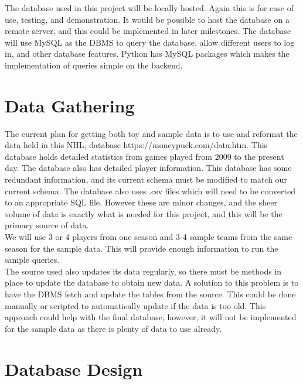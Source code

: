 \documentclass[11pt]{article}
\begin{document}
The database used in this project will be locally hosted. Again this is for ease of use, testing, and demonstration. It would be possible to host the database on a remote server, and this could be implemented in later milestones. The database will use MySQL as the DBMS to query the database, allow different users to log in, and other database features. Python has MySQL packages which makes the implementation of queries simple on the backend. \\ 

\section{Data Gathering}
The current plan for getting both toy and sample data is to use and reformat the data held in this NHL, database https://moneypuck.com/data.htm. This database holds detailed statistics from games played from 2009 to the present day. The database also has detailed player information. This database has some redundant information, and its current schema must be modified to match our current schema. The database also uses .csv files which will need to be converted to an appropriate SQL file. However these are minor changes, and the sheer volume of data is exactly what is needed for this project, and this will be the primary source of data. \\

We will use 3 or 4 players from one season and 3-4 sample teams from the same season for the sample data. This will provide enough information to run the sample queries. \\

The source used also updates its data regularly, so there must be methods in place to update the database to obtain new data. A solution to this problem is to have the DBMS fetch and update the tables from the source. This could be done manually or scripted to automatically update if the data is too old. This approach could help with the final database, however, it will not be implemented for the sample data as there is plenty of data to use already. \\


\section{Database Design}
\end{document}
